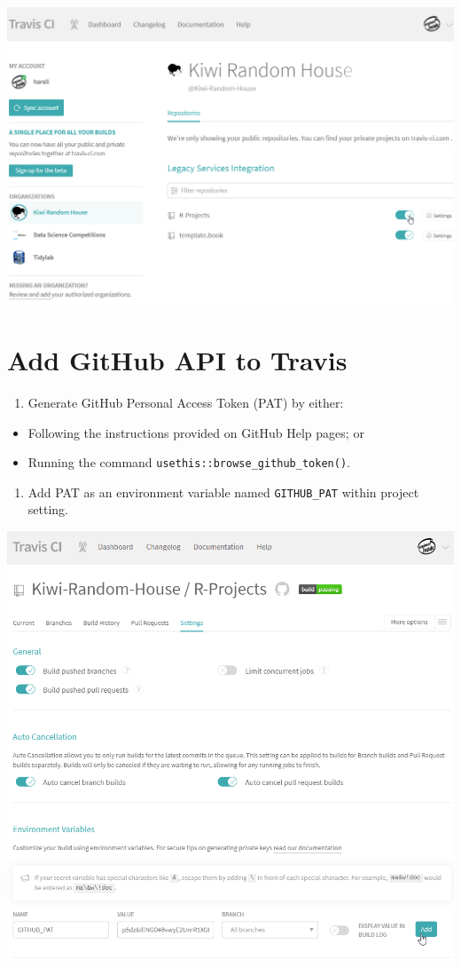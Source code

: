 \documentclass[]{book}
\providecommand{\tightlist}{%
  \setlength{\itemsep}{0pt}\setlength{\parskip}{0pt}}
\begin{document}
\begin{center}\includegraphics[width=0.7\linewidth]{images/baef0bd157faee7c5dac5dbe2712c3b6} \end{center}

\hypertarget{add-github-api-to-travis}{%
\section{Add GitHub API to Travis}\label{add-github-api-to-travis}}

\begin{enumerate}
\def\labelenumi{\arabic{enumi}.}
\tightlist
\item
  Generate GitHub Personal Access Token (PAT) by either:
\end{enumerate}

\begin{itemize}
\tightlist
\item
  Following the instructions provided on GitHub Help pages; or
\item
  Running the command \texttt{usethis::browse\_github\_token()}.
\end{itemize}

\begin{enumerate}
\def\labelenumi{\arabic{enumi}.}
\setcounter{enumi}{1}
\tightlist
\item
  Add PAT as an environment variable named \texttt{GITHUB\_PAT} within project setting.
\end{enumerate}

\begin{center}\includegraphics[width=0.7\linewidth]{images/0fcd976cfcba59500407c33c05ecd4b0} \end{center}
\end{document}

